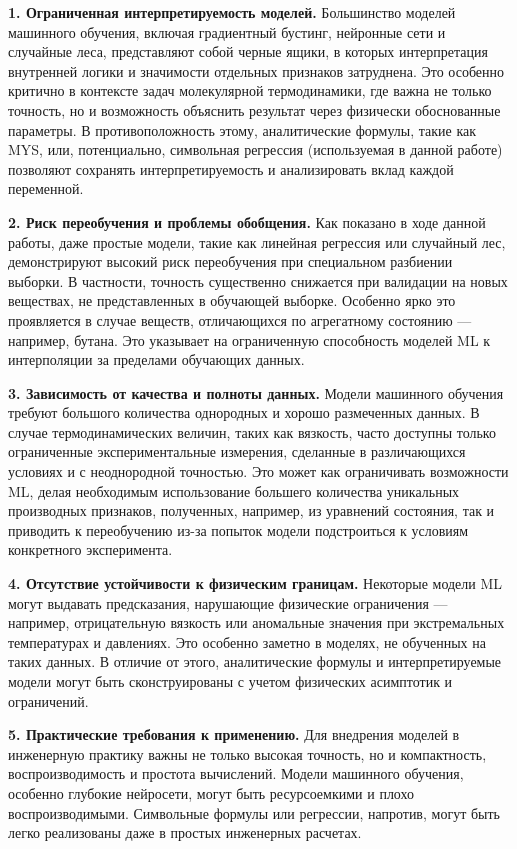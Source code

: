\documentclass[a4paper,12pt]{article}
\begin{document}
\textbf{1. Ограниченная интерпретируемость моделей.}
Большинство моделей машинного обучения, включая градиентный бустинг, нейронные сети и случайные леса, представляют собой черные ящики, в которых интерпретация внутренней логики и значимости отдельных признаков затруднена. Это особенно критично в контексте задач молекулярной термодинамики, где важна не только точность, но и возможность объяснить результат через физически обоснованные параметры. В противоположность этому, аналитические формулы, такие как MYS, или, потенциально, символьная регрессия (используемая в данной работе) позволяют сохранять интерпретируемость и анализировать вклад каждой переменной.

\textbf{2. Риск переобучения и проблемы обобщения.}
Как показано в ходе данной работы, даже простые модели, такие как линейная регрессия или случайный лес, демонстрируют высокий риск переобучения при специальном разбиении выборки. В частности, точность существенно снижается при валидации на новых веществах, не представленных в обучающей выборке. Особенно ярко это проявляется в случае веществ, отличающихся по агрегатному состоянию — например, бутана. Это указывает на ограниченную способность моделей ML к интерполяции за пределами обучающих данных.

\textbf{3. Зависимость от качества и полноты данных.}
Модели машинного обучения требуют большого количества однородных и хорошо размеченных данных. В случае термодинамических величин, таких как вязкость, часто доступны только ограниченные экспериментальные измерения, сделанные в различающихся условиях и с неоднородной точностью. Это может как ограничивать возможности ML, делая необходимым использование большего количества уникальных производных признаков, полученных, например, из уравнений состояния, так и приводить к переобучению из-за попыток модели подстроиться к условиям конкретного эксперимента.

\textbf{4. Отсутствие устойчивости к физическим границам.}
Некоторые модели ML могут выдавать предсказания, нарушающие физические ограничения — например, отрицательную вязкость или аномальные значения при экстремальных температурах и давлениях. Это особенно заметно в моделях, не обученных на таких данных. В отличие от этого, аналитические формулы и интерпретируемые модели могут быть сконструированы с учетом физических асимптотик и ограничений.

\textbf{5. Практические требования к применению.}
Для внедрения моделей в инженерную практику важны не только высокая точность, но и компактность, воспроизводимость и простота вычислений. Модели машинного обучения, особенно глубокие нейросети, могут быть ресурсоемкими и плохо воспроизводимыми. Символьные формулы или регрессии, напротив, могут быть легко реализованы даже в простых инженерных расчетах.
\end{document}
